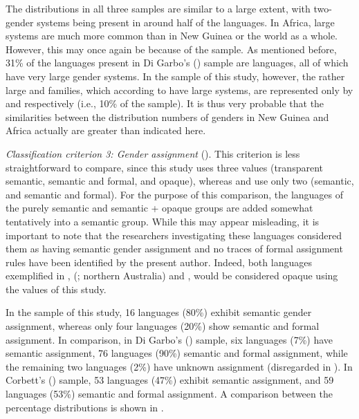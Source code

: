 \documentclass[output=collectionpaper]{langsci/langscibook}
\begin{document}
The distributions in all three samples are similar to a large extent, with two-gender systems being present in around half of the languages. In Africa, large systems are much more common than in New Guinea or the world as a whole. However, this may once again be because of the sample. As mentioned before, 31\% of the languages present in Di Garbo's (\citeyear{DiGarbo2014}) sample are  languages, all of which have very large gender systems. In the sample of this study, however, the rather large  and  families, which according to \citet[372]{Foley2000} have large systems, are represented only by  and  respectively (i.e., 10\% of the sample). It is thus very probable that the similarities between the distribution numbers of genders in New Guinea and Africa actually are greater than indicated here.


\textit{Classification criterion 3: Gender assignment} ().
This criterion is less straightforward to compare, since this study uses three values (transparent semantic, semantic and formal, and opaque), whereas \citet{DiGarbo2014} and \citet{Corbett2013b} use only two (semantic, and semantic and formal). For the purpose of this comparison, the languages of the purely semantic and semantic + opaque groups are added somewhat tentatively into a semantic group. While this may appear misleading, it is important to note that the researchers investigating these languages considered them as having semantic gender assignment and no traces of formal assignment rules have been identified by the present author. Indeed, both languages exemplified in \citet{Corbett2013b},  (; northern Australia) and , would be considered opaque using the values of this study.



In the sample of this study, 16 languages (80\%) exhibit semantic gender assignment, whereas only four languages (20\%) show semantic and formal assignment.  In comparison, in Di Garbo's (\citeyear[67]{DiGarbo2014}) sample, six languages (7\%) have semantic assignment, 76 languages (90\%) semantic and formal assignment, while the remaining two languages (2\%) have unknown assignment (disregarded in ). In Corbett's (\citeyear{Corbett2013b}) sample, 53 languages (47\%) exhibit semantic assignment, and 59 languages (53\%) semantic and formal assignment. A comparison between the percentage distributions is shown in .
\end{document}
